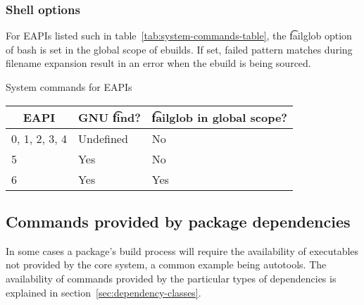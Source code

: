 \subsubsection{Shell options}

 For EAPIs listed such in table~\ref{tab:system-commands-table}, the
\t{failglob} option of bash is set in the global scope of ebuilds. If set, failed pattern matches
during filename expansion result in an error when the ebuild is being sourced.

\begin{centertable}{System commands for EAPIs}
    \label{tab:system-commands-table}
    \begin{tabular}{lll}
      \toprule
      \multicolumn{1}{c}{\textbf{EAPI}} &
      \multicolumn{1}{c}{\textbf{GNU \t{find}?}} &
      \multicolumn{1}{c}{\textbf{\t{failglob} in global scope?}} \\
      \midrule
      0, 1, 2, 3, 4     & Undefined & No  \\
      5                 & Yes       & No  \\
      6                 & Yes       & Yes \\
      \bottomrule
    \end{tabular}
\end{centertable}

\subsection{Commands provided by package dependencies}

In some cases a package's build process will require the availability of executables not provided by
the core system, a common example being autotools. The availability of commands provided by the
particular types of dependencies is explained in section~\ref{sec:dependency-classes}.




